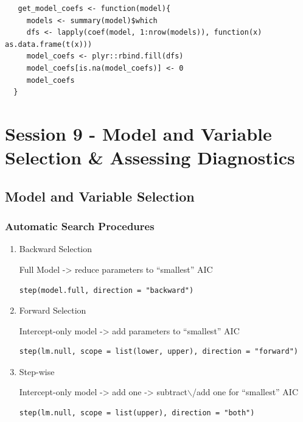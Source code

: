 \documentclass[11pt]{article}
\begin{document}
\begin{enumerate}
\begin{verbatim}
   get_model_coefs <- function(model){
     models <- summary(model)$which
     dfs <- lapply(coef(model, 1:nrow(models)), function(x) as.data.frame(t(x)))
     model_coefs <- plyr::rbind.fill(dfs)
     model_coefs[is.na(model_coefs)] <- 0
     model_coefs
  }
\end{verbatim}
\end{enumerate}
\section{Session 9 - Model and Variable Selection \& Assessing Diagnostics}
\label{sec:org83e69b3}
\subsection{Model and Variable Selection}
\label{sec:orgc94f0b3}
\subsubsection{Automatic Search Procedures}
\label{sec:orgcf916f6}
\begin{enumerate}
\item Backward Selection
\label{sec:orgb3726f5}

Full Model -> reduce parameters to ``smallest'' AIC

\begin{verbatim}
step(model.full, direction = "backward")
\end{verbatim}

\item Forward Selection
\label{sec:orgd4d81c1}

Intercept-only model -> add parameters to ``smallest'' AIC

\begin{verbatim}
step(lm.null, scope = list(lower, upper), direction = "forward")
\end{verbatim}

\item Step-wise
\label{sec:org8662ba7}

Intercept-only model -> add one -> subtract$\backslash$/add one for ``smallest'' AIC

\begin{verbatim}
step(lm.null, scope = list(upper), direction = "both")
\end{verbatim}
\end{enumerate}
\end{document}
